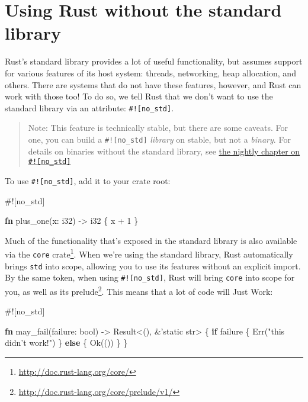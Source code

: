 \documentclass[a4paper,]{book}
\newenvironment{Shaded}{\begin{snugshade}}{\end{snugshade}}
\newcommand{\KeywordTok}[1]{\textcolor[rgb]{0.13,0.29,0.53}{\textbf{{#1}}}}
\newcommand{\DataTypeTok}[1]{\textcolor[rgb]{0.13,0.29,0.53}{{#1}}}
\newcommand{\DecValTok}[1]{\textcolor[rgb]{0.00,0.00,0.81}{{#1}}}
\newcommand{\ConstantTok}[1]{\textcolor[rgb]{0.00,0.00,0.00}{{#1}}}
\newcommand{\StringTok}[1]{\textcolor[rgb]{0.31,0.60,0.02}{{#1}}}
\newcommand{\OtherTok}[1]{\textcolor[rgb]{0.56,0.35,0.01}{{#1}}}
\newcommand{\AttributeTok}[1]{\textcolor[rgb]{0.77,0.63,0.00}{{#1}}}
\newcommand{\NormalTok}[1]{{#1}}
\renewcommand{\href}[2]{#2\footnote{\url{#1}}}
\begin{document}
\hypertarget{sec--using-rust-without-the-standard-library}{\section{Using
Rust without the standard
library}\label{sec--using-rust-without-the-standard-library}}

Rust's standard library provides a lot of useful functionality, but
assumes support for various features of its host system: threads,
networking, heap allocation, and others. There are systems that do not
have these features, however, and Rust can work with those too! To do
so, we tell Rust that we don't want to use the standard library via an
attribute: \texttt{\#!{[}no\_std{]}}.

\begin{quote}
Note: This feature is technically stable, but there are some caveats.
For one, you can build a \texttt{\#!{[}no\_std{]}} \emph{library} on
stable, but not a \emph{binary}. For details on binaries without the
standard library, see \protect\hyperlink{sec--no-stdlib}{the nightly
chapter on \texttt{\#!{[}no\_std{]}}}
\end{quote}

To use \texttt{\#!{[}no\_std{]}}, add it to your crate root:

\begin{Shaded}
\begin{Highlighting}[]
\AttributeTok{#![}\NormalTok{no_std}\AttributeTok{]}

\KeywordTok{fn} \NormalTok{plus_one(x: }\DataTypeTok{i32}\NormalTok{) -> }\DataTypeTok{i32} \NormalTok{\{}
    \NormalTok{x + }\DecValTok{1}
\NormalTok{\}}
\end{Highlighting}
\end{Shaded}

Much of the functionality that's exposed in the standard library is also
available via the \href{http://doc.rust-lang.org/core/}{\texttt{core}
crate}. When we're using the standard library, Rust automatically brings
\texttt{std} into scope, allowing you to use its features without an
explicit import. By the same token, when using
\texttt{\#!{[}no\_std{]}}, Rust will bring \texttt{core} into scope for
you, as well as \href{http://doc.rust-lang.org/core/prelude/v1/}{its
prelude}. This means that a lot of code will Just Work:

\begin{Shaded}
\begin{Highlighting}[]
\AttributeTok{#![}\NormalTok{no_std}\AttributeTok{]}

\KeywordTok{fn} \NormalTok{may_fail(failure: }\DataTypeTok{bool}\NormalTok{) -> }\DataTypeTok{Result}\NormalTok{<(), &}\OtherTok{'static} \DataTypeTok{str}\NormalTok{> \{}
    \KeywordTok{if} \NormalTok{failure \{}
        \ConstantTok{Err}\NormalTok{(}\StringTok{"this didn’t work!"}\NormalTok{)}
    \NormalTok{\} }\KeywordTok{else} \NormalTok{\{}
        \ConstantTok{Ok}\NormalTok{(())}
    \NormalTok{\}}
\NormalTok{\}}
\end{Highlighting}
\end{Shaded}
\end{document}
